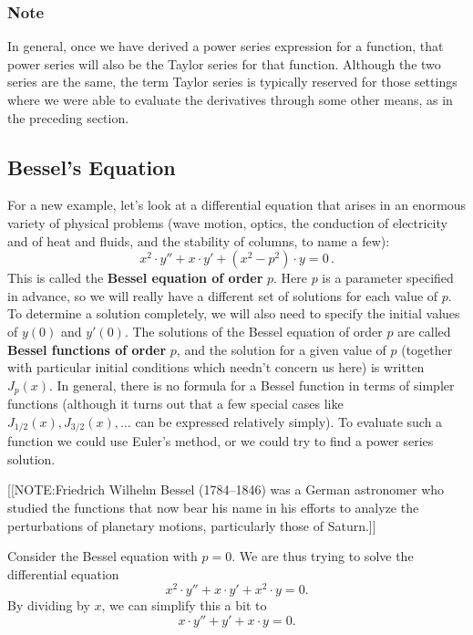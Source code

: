 \subsubsection{Note}
In general, once we have derived a power series expression
for a function, that power series will also be the Taylor series for
that function.  Although the two series are the same, the term Taylor
series is typically reserved for those settings where we were able to
evaluate the derivatives through some other means, as in the preceding
section.

\subsection{Bessel's Equation}
\label{subsec:bessels-equation}

For a new example, let's look at a differential equation that arises
in an enormous variety of physical problems (wave motion, optics, the
conduction of electricity and of heat and fluids, and the stability of
columns, to name a few):
\[
x^2 \cdot y'' + x \cdot y' + (x^2 - p^2) \cdot y = 0 \, .
\]
This is called the {\bf Bessel equation of order} {\boldmath $p$}.
Here $p$ is a parameter specified in advance, so we will really have a
different set of solutions for each value of $p$.  To determine a
solution completely, we will also need to specify the initial values
of $y(0)$ and $y'(0)$.  The solutions of the Bessel equation of order
$p$ are called {\bf Bessel functions of order} {\boldmath
  $p$}, and the solution for a
given value of $p$ (together with particular initial conditions which
needn't concern us here) is written $J_p(x)$.  In general, there is no
formula for a Bessel function in terms of simpler functions (although
it turns out that a few special cases like $J_{1/2}(x), J_{3/2}(x) ,
\ldots$ can be expressed relatively simply).  To evaluate such a
function we could use Euler's method, or we could try to find a power
series solution.

[[NOTE:Friedrich Wilhelm Bessel (1784--1846) was a German astronomer who studied the
  functions that now bear his name in his efforts to analyze the
  perturbations of planetary motions, particularly those of Saturn.]]

\enlargethispage*{20pt}
Consider the Bessel equation with $p=0$.  We are thus trying to solve
the differential equation
\[
x^2 \cdot y'' + x \cdot y' + x^2  \cdot y = 0.
\]
By dividing by $x$, we can simplify this a bit to
\[
x \cdot y'' + y' + x \cdot y = 0.
\]

